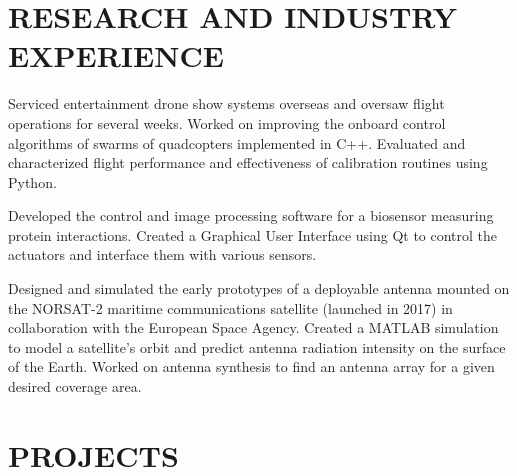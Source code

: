 \documentclass{ResumeTemplate}
\begin{document}
	\section{RESEARCH AND INDUSTRY EXPERIENCE}
	

	\workitemsthree
	{Serviced entertainment drone show systems overseas and oversaw flight operations for several weeks.}
	{Worked on improving the onboard control algorithms of swarms of quadcopters implemented in C++.}
	{Evaluated and characterized flight performance and effectiveness of calibration routines using Python.}
	
	
	\workitemstwo
	{Developed the control and image processing software for a biosensor measuring protein interactions.}
	{Created a Graphical User Interface using Qt to control the actuators and interface them with various sensors.}
	

	\workitemstwo
	{Designed and simulated the early prototypes of a deployable antenna mounted on the NORSAT-2 maritime communications satellite (launched in 2017) in collaboration with the European Space Agency.}
	{Created a MATLAB simulation to model a satellite's orbit and predict antenna radiation intensity on the surface of the Earth. Worked on antenna synthesis to find an antenna array for a given desired coverage area.}
	
	\section{PROJECTS}
	
\end{document}
